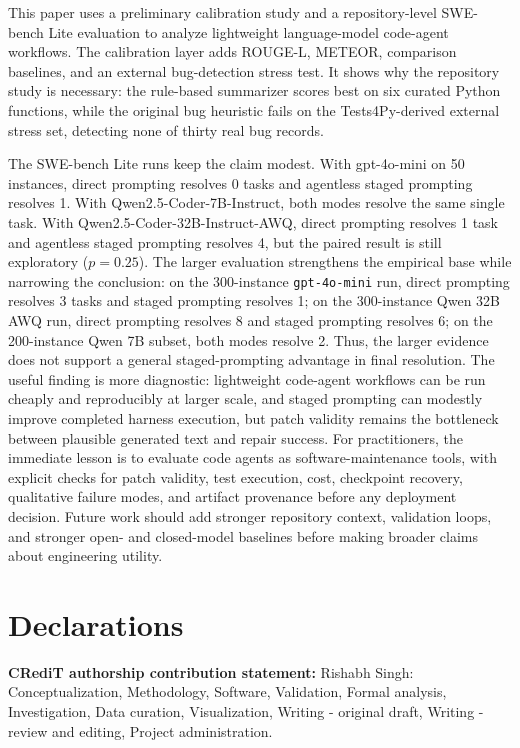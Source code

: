 \documentclass[preprint,12pt]{elsarticle}
\begin{document}
This paper uses a preliminary calibration study and a repository-level SWE-bench Lite evaluation to analyze lightweight language-model code-agent workflows. The calibration layer adds ROUGE-L, METEOR, comparison baselines, and an external bug-detection stress test. It shows why the repository study is necessary: the rule-based summarizer scores best on six curated Python functions, while the original bug heuristic fails on the Tests4Py-derived external stress set, detecting none of thirty real bug records.

The SWE-bench Lite runs keep the claim modest. With gpt-4o-mini on 50 instances, direct prompting resolves 0 tasks and agentless staged prompting resolves 1. With Qwen2.5-Coder-7B-Instruct, both modes resolve the same single task. With Qwen2.5-Coder-32B-Instruct-AWQ, direct prompting resolves 1 task and agentless staged prompting resolves 4, but the paired result is still exploratory ($p = 0.25$). The larger evaluation strengthens the empirical base while narrowing the conclusion: on the 300-instance \texttt{gpt-4o-mini} run, direct prompting resolves 3 tasks and staged prompting resolves 1; on the 300-instance Qwen 32B AWQ run, direct prompting resolves 8 and staged prompting resolves 6; on the 200-instance Qwen 7B subset, both modes resolve 2. Thus, the larger evidence does not support a general staged-prompting advantage in final resolution. The useful finding is more diagnostic: lightweight code-agent workflows can be run cheaply and reproducibly at larger scale, and staged prompting can modestly improve completed harness execution, but patch validity remains the bottleneck between plausible generated text and repair success. For practitioners, the immediate lesson is to evaluate code agents as software-maintenance tools, with explicit checks for patch validity, test execution, cost, checkpoint recovery, qualitative failure modes, and artifact provenance before any deployment decision. Future work should add stronger repository context, validation loops, and stronger open- and closed-model baselines before making broader claims about engineering utility.

\section*{Declarations}

\noindent\textbf{CRediT authorship contribution statement:} Rishabh Singh: Conceptualization, Methodology, Software, Validation, Formal analysis, Investigation, Data curation, Visualization, Writing - original draft, Writing - review and editing, Project administration.
\end{document}
